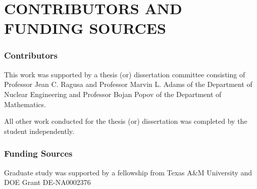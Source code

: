 \chapter*{CONTRIBUTORS AND FUNDING SOURCES}




%
%
% 
%
%
%
%
%

\subsection*{Contributors}
This work was supported by a thesis (or) dissertation committee consisting of Professor Jean C. Ragusa and Professor Marvin L. Adams of the Department of Nuclear Engineering and Professor Bojan Popov of the Department of Mathematics.


All other work conducted for the thesis (or) dissertation was completed by the student independently.
\subsection*{Funding Sources}
Graduate study was supported by a fellowship from Texas A\&M University and DOE Grant DE-NA0002376  

\pagebreak{}
